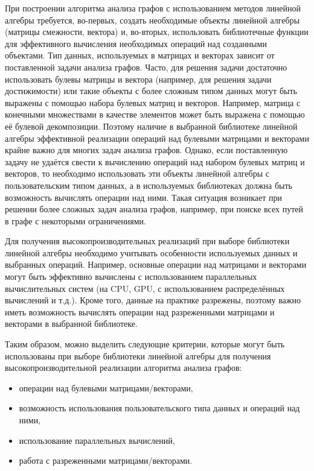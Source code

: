  При построении алгоритма анализа графов с использованием методов линейной алгебры требуется, во-первых, создать необходимые объекты линейной алгебры (матрицы смежности, вектора) и, во-вторых, использовать библиотечные функции для эффективного вычисления необходимых операций над созданными объектами. Тип данных, используемых в матрицах и векторах зависит от поставленной задачи анализа графов. Часто, для решения задачи достаточно использовать булевы матрицы и вектора (например, для решения задачи достижимости) или такие объекты с более сложным типом данных могут быть выражены с помощью набора булевых матриц и векторов. Например, матрица с конечными множествами в качестве элементов может быть выражена с помощью её булевой декомпозиции. Поэтому наличие в выбранной библиотеке линейной алгебры эффективной реализации операций над булевыми матрицами и векторами крайне важно для многих задач анализа графов. Однако, если поставленную задачу не удаётся свести к вычислению операций над набором булевых матриц и векторов, то необходимо использовать эти объекты линейной алгебры с пользовательским типом данных, а в используемых библиотеках должна быть возможность вычислять операции над ними. Такая ситуация возникает при решении более сложных задач анализа графов, например, при поиске всех путей в графе с некоторыми ограничениями.
 
 Для получения высокопроизводительных реализаций при выборе библиотеки линейной алгебры необходимо учитывать особенности используемых данных и выбранных операций. Например, основные операции над матрицами и векторами могут быть эффективно вычислены с использованием параллельных вычислительных систем (на CPU, GPU, с использованием распределённых вычислений и т.д.). Кроме того, данные на практике разрежены, поэтому важно иметь возможность вычислять операции над разреженными матрицами и векторами в выбранной библиотеке.
 
 Таким образом, можно выделить следующие критерии, которые могут быть использованы при выборе библиотеки линейной алгебры для получения высокопроизводительной реализации алгоритма анализа графов:
 
 \begin{itemize}
     \item операции над булевыми матрицами/векторами,
     \item возможность использования пользовательского типа данных и операций над ними,
     \item использование параллельных вычислений,
     \item работа с разреженными матрицами/векторами.
 \end{itemize}
 
